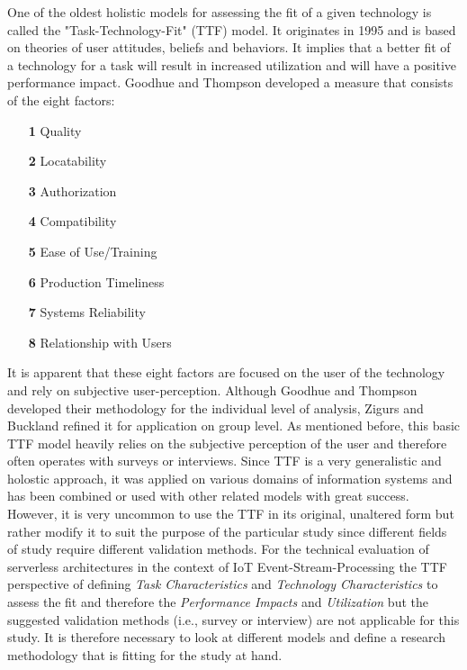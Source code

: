     One of the oldest holistic models for assessing the fit of a given technology is called the "Task-Technology-Fit" (TTF) model. It originates in 1995 and is based on theories of user attitudes, beliefs and behaviors. It implies that a better fit of a technology for a task will result in increased utilization and will have a positive performance impact. Goodhue and Thompson developed a measure that consists of the eight factors:
    \begin{enumerate}[nolistsep]
        \item[\textbf{1}] Quality
        \item[\textbf{2}] Locatability
        \item[\textbf{3}] Authorization
        \item[\textbf{4}] Compatibility
        \item[\textbf{5}] Ease of Use/Training
        \item[\textbf{6}] Production Timeliness
        \item[\textbf{7}] Systems Reliability
        \item[\textbf{8}] Relationship with Users
    \end{enumerate}
    It is apparent that these eight factors are focused on the user of the technology and rely on subjective user-perception. Although Goodhue and Thompson developed their methodology for the individual level of analysis, Zigurs and Buckland refined it for application on group level.\autocite{Zigurs1998AEffectiveness} As mentioned before, this basic TTF model heavily relies on the subjective perception of the user and therefore often operates with surveys or interviews. Since TTF is a very generalistic and holostic approach, it was applied on various domains of information systems and has been combined or used with other related models with great success.\\ 
    However, it is very uncommon to use the TTF in its original, unaltered form but rather modify it to suit the purpose of the particular study since different fields of study require different validation methods. For the technical evaluation of serverless architectures in the context of IoT Event-Stream-Processing the TTF perspective of defining \textit{Task Characteristics} and \textit{Technology Characteristics} to assess the fit and therefore the \textit{Performance Impacts} and \textit{Utilization} but the suggested validation methods (i.e., survey or interview) are not applicable for this study. It is therefore necessary to look at different models and define a research methodology that is fitting for the study at hand. 
    
